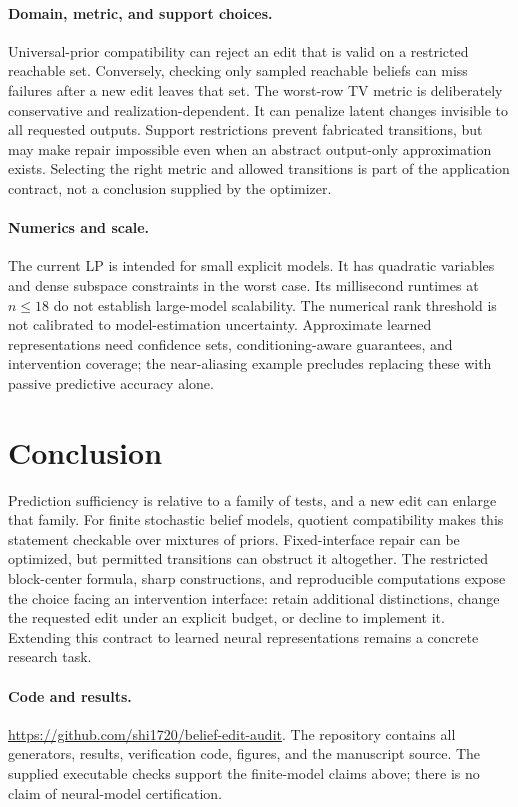 \documentclass[11pt,letterpaper]{article}
\begin{document}
\paragraph{Domain, metric, and support choices.}
Universal-prior compatibility can reject an edit that is valid on a restricted reachable set. Conversely, checking only sampled reachable beliefs can miss failures after a new edit leaves that set. The worst-row TV metric is deliberately conservative and realization-dependent. It can penalize latent changes invisible to all requested outputs. Support restrictions prevent fabricated transitions, but may make repair impossible even when an abstract output-only approximation exists. Selecting the right metric and allowed transitions is part of the application contract, not a conclusion supplied by the optimizer.

\paragraph{Numerics and scale.}
The current LP is intended for small explicit models. It has quadratic variables and dense subspace constraints in the worst case. Its millisecond runtimes at $n\le18$ do not establish large-model scalability. The numerical rank threshold is not calibrated to model-estimation uncertainty. Approximate learned representations need confidence sets, conditioning-aware guarantees, and intervention coverage; the near-aliasing example precludes replacing these with passive predictive accuracy alone.

\section{Conclusion}
Prediction sufficiency is relative to a family of tests, and a new edit can enlarge that family. For finite stochastic belief models, quotient compatibility makes this statement checkable over mixtures of priors. Fixed-interface repair can be optimized, but permitted transitions can obstruct it altogether. The restricted block-center formula, sharp constructions, and reproducible computations expose the choice facing an intervention interface: retain additional distinctions, change the requested edit under an explicit budget, or decline to implement it. Extending this contract to learned neural representations remains a concrete research task.

\paragraph{Code and results.}
\url{https://github.com/shi1720/belief-edit-audit}. The repository contains all generators, results, verification code, figures, and the manuscript source. The supplied executable checks support the finite-model claims above; there is no claim of neural-model certification.
\end{document}
